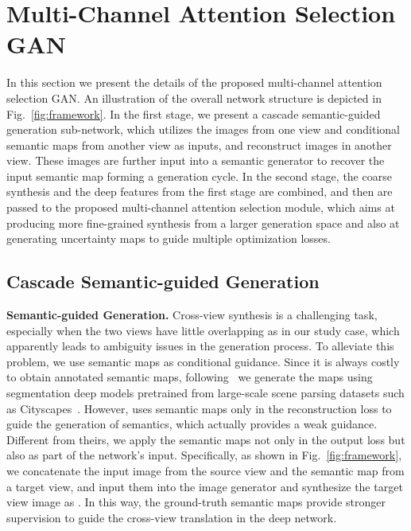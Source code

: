 \documentclass[10pt,twocolumn,letterpaper]{article}
\begin{document}
\section{Multi-Channel Attention Selection GAN}
\vspace{-0.1cm}
In this section we present the details of the proposed multi-channel attention selection GAN. An illustration of the overall network structure is depicted in Fig.~\ref{fig:framework}. 
In the first stage, we present a cascade semantic-guided generation sub-network, which utilizes the images from one view and conditional semantic maps from another view as inputs, and reconstruct images in another view. These images are further input into a semantic generator to recover the input semantic map forming a generation cycle. In the second stage, the coarse synthesis and the deep features from the first stage are combined, and then are passed to the proposed multi-channel attention selection module, which aims at producing more fine-grained synthesis from a larger generation space and also at generating uncertainty maps to guide multiple optimization losses.

\subsection{Cascade Semantic-guided Generation}
\vspace{-0.2cm}
\noindent \textbf{Semantic-guided Generation.}
Cross-view synthesis is a challenging task, especially when the two views have little overlapping as in our study case, which apparently leads to ambiguity issues in the generation process. To alleviate this problem, we use semantic maps as conditional guidance. Since it is always costly to obtain annotated semantic maps, following~\cite{regmi2018cross} we generate the maps using segmentation deep models pretrained from large-scale scene parsing datasets such as Cityscapes~\cite{cordts2016cityscapes}. However, \cite{regmi2018cross} uses semantic maps only in the reconstruction loss to guide the generation of semantics, which actually provides a weak guidance. Different from theirs, we apply the semantic maps not only in the output loss but also as part of the network's input. Specifically, as shown in Fig.~\ref{fig:framework}, we concatenate the input image  from the source view and the semantic map  from a target view, and input them into the image generator  and synthesize the target view image  as .
In this way, the ground-truth semantic maps provide stronger supervision to guide the cross-view translation in the deep network.
\end{document}
